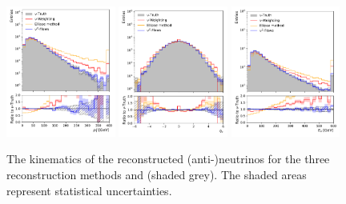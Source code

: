 \begin{figure}[htpb]
    \centering
    \includegraphics[width=0.32\textwidth]{Figures/neutrino_unfolding/nu_reco/nuanti_nu_pt.pdf}
    \includegraphics[width=0.32\textwidth]{Figures/neutrino_unfolding/nu_reco/nuanti_nu_eta.pdf}
    \includegraphics[width=0.32\textwidth]{Figures/neutrino_unfolding/nu_reco/nuanti_nu_E.pdf}
    \caption{The kinematics of the reconstructed (anti-)neutrinos for the three reconstruction methods and \vtruth (shaded grey). The shaded areas represent statistical uncertainties.}
    \label{fig:vvbarkinematics}
\end{figure}

